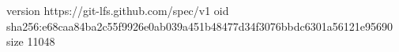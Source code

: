 version https://git-lfs.github.com/spec/v1
oid sha256:e68caa84ba2c55f9926e0ab039a451b48477d34f3076bbdc6301a56121e95690
size 11048
